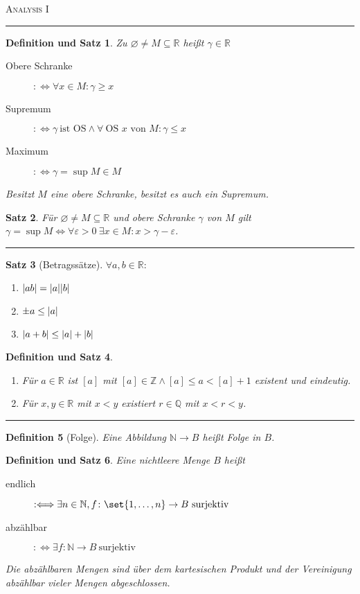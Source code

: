 \documentclass[a4paper]{article}
\newcounter{Sec}
\theoremstyle{marginbreak}
\newtheorem{definition}{Definition}[Sec]
\newtheorem{satz}[definition]{Satz}
\newtheorem{defsatz}[definition]{Definition und Satz}
\newcommand{\sep}{%
	\rule{\textwidth}{0.3pt}%
	\stepcounter{Sec}%
	}
\newcommand{\defiff}{:\Longleftrightarrow}
\begin{document}
	\textsc{Analysis I}

	\sep
	\begin{defsatz}
		Zu $\varnothing\neq M\subseteq\mathbb{R}$ heißt $\gamma\in\mathbb{R}$
		\begin{description}
			\item[Obere Schranke] $\defiff \forall x\in M: \gamma\geq x$
			\item[Supremum] $\defiff \gamma~\text{ist OS} \wedge \forall~\text{OS $x$ von $M$}: \gamma\leq x$
			\item[Maximum] $\defiff \gamma = \sup M\in M$
		\end{description}
		Besitzt $M$ eine obere Schranke, besitzt es auch ein Supremum.
	\end{defsatz}
	\begin{satz}
		Für $\varnothing\neq M\subseteq\mathbb{R}$ und obere Schranke $\gamma$ von $M$ gilt
		$\gamma = \sup M\iff\forall\varepsilon>0~\exists x\in M:x>\gamma-\varepsilon$.
	\end{satz}
	\sep
	\begin{satz}[Betragssätze]
		$\forall a,b\in\mathbb{R}:$
		\begin{enumerate}[label=(\alph*)]
			\item $\abs{ab}=\abs{a}\abs{b}$
			\item $\pm a\leq\abs{a}$
			\item $\abs{a+b}\leq\abs{a}+\abs{b}$
		\end{enumerate}
	\end{satz}
	\begin{defsatz}
		\begin{enumerate}[label=(\alph*)]
			\item Für $a\in\mathbb{R}$ ist $[a]$ mit $[a]\in\mathbb{Z}\wedge [a]\leq a<[a]+1$ existent und eindeutig.
			\item Für $x,y\in\mathbb{R}$ mit $x<y$ existiert $r\in\mathbb{Q}$ mit $x<r<y$.
		\end{enumerate}
	\end{defsatz}
	\sep
	\begin{definition}[Folge]
		Eine Abbildung $\mathbb{N}\to B$ heißt Folge in $B$.
	\end{definition}
	\begin{defsatz}
		Eine nichtleere Menge $B$ heißt
		\begin{description}
			\item[endlich] $\defiff\exists n\in\mathbb{N},f\colon \set{1,\ldots,n}\to B~\text{surjektiv}$
			\item[abzählbar] $\defiff\exists f\colon\mathbb{N}\to B~\text{surjektiv}$
		\end{description}
		Die abzählbaren Mengen sind über dem kartesischen Produkt und der
		Vereinigung abzählbar vieler Mengen abgeschlossen.
	\end{defsatz}
\end{document}
